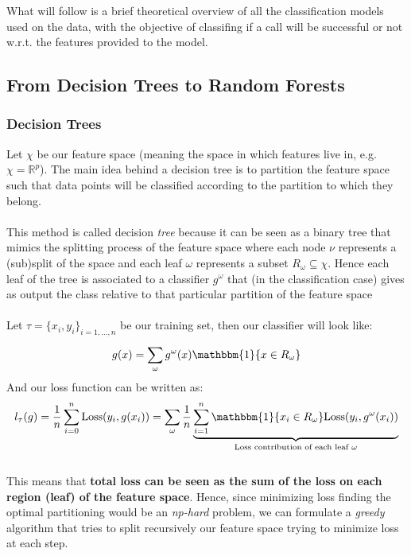 What will follow is a brief theoretical overview of all the classification models used on the data, with the objective of classifing if a call will be successful or not w.r.t. the features provided to the model.

\subsection{From Decision Trees to Random Forests}
\subsubsection*{Decision Trees}
Let \(\chi\) be our feature space (meaning the space in which features live in, e.g. \(\chi = \mathbb{R}^p\)). The main idea behind a decision tree is to partition the feature space such that data points will be classified according to the partition to which they belong. \\
\\
This method is called decision \textit{tree} because it can be seen as a binary tree that mimics the splitting process of the feature space where each node \(\nu\) represents a (sub)split of the space and each leaf \(\omega\) represents a subset \(R_\omega \subseteq \chi\). Hence each leaf of the tree is associated to a classifier \(g^\omega\) that (in the classification case) gives as output the class relative to that particular partition of the feature space
\\
\\
Let \(\tau = \{x_i, y_i \}_{i = 1, \dots ,n}\) be our training set, then our classifier will look like:
\begin{equation}
    g(x) =  \sum \limits_{\omega}^{} g^\omega(x)\mathbbm{1}\{x \in R_\omega\}
\end{equation}
And our loss function can be written as:
\begin{equation}
    l_\tau(g) = \frac{1}{n}  \sum \limits_{i= 0}^{n}\text{Loss}(y_i, g(x_i)) =  \sum \limits_{\omega}^{} \frac{1}{n} \underbrace{\sum \limits_{i=1}^{n} \mathbbm{1}\{x_i  \in R_\omega \} \text{Loss}(y_i, g^\omega(x_i))}_{\text{Loss contribution of each leaf }\omega}
\end{equation}
\\
This means that \textbf{total loss can be seen as the sum of the loss on each region (leaf) of the feature space}. Hence, since minimizing loss finding the optimal partitioning would be an \textit{np-hard} problem, we can formulate a \textit{greedy} algorithm that tries to split recursively our feature space trying to minimize loss at each step.
